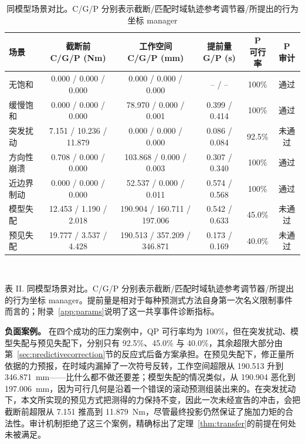 \documentclass[journal]{IEEEtran}
\begin{document}
\begin{table}[t]
\caption{同模型场景对比。C/G/P 分别表示截断/匹配时域轨迹参考调节器/所提出的行为坐标 manager}
\label{tab:scenarios}
\centering
\footnotesize
\setlength{\tabcolsep}{4pt}
\begin{tabular}{@{}lccccc@{}}
\toprule
场景 & \shortstack{截断前\\C/G/P (Nm)} & \shortstack{工作空间\\C/G/P (mm)} & \shortstack{提前量\\G/P (s)} & \shortstack{P\\可行率} & \shortstack{P\\审计} \\
\midrule
无饱和 & 0.000 / 0.000 / 0.000 & 0.000 / 0.000 / 0.000 & -- / -- & 100\% & 通过 \\
缓慢饱和 & 0.000 / 0.000 / 0.000 & 78.970 / 0.000 / 0.001 & 0.399 / 0.414 & 100\% & 通过 \\
突发扰动 & 7.151 / 10.236 / 11.879 & 0.000 / 0.000 / 0.000 & 0.086 / 0.084 & 92.5\% & 未通过 \\
方向性崩溃 & 0.708 / 0.000 / 0.000 & 103.868 / 0.000 / 0.003 & 0.307 / 0.340 & 100\% & 通过 \\
近边界制动 & 0.000 / 0.000 / 0.000 & 52.537 / 0.000 / 0.011 & 0.574 / 0.568 & 100\% & 通过 \\
模型失配 & 12.453 / 1.190 / 2.018 & 190.904 / 160.711 / 197.006 & 0.542 / 0.633 & 45.0\% & 未通过 \\
预见失配 & 19.777 / 3.537 / 4.428 & 190.513 / 357.209 / 346.871 & 0.173 / 0.169 & 40.0\% & 未通过 \\
\bottomrule
\end{tabular}
\\[2pt]
\raggedright\footnotesize 表 II. 同模型场景对比。C/G/P 分别表示截断/匹配时域轨迹参考调节器/所提出的行为坐标 manager。提前量是相对于每种预测式方法自身第一次名义限制事件而言的；附录~\ref{app:params}说明了这一共享事件诊断指标。
\end{table}

\textbf{负面案例。} 在四个成功的压力案例中，QP 可行率均为 100\%，但在突发扰动、模型失配与预见失配下，分别只有 92.5\%、45.0\% 与 40.0\%，其余超限大部分由第~\ref{sec:predictivecorrection}节的反应式后备方案承担。在预见失配下，修正量所依据的力预报，在时域内漏掉了一次符号反转，工作空间超限从 190.513 升到 346.871~mm——比什么都不做还要差；模型失配的情况类似，从 190.904 恶化到 197.006~mm，因为可行几何是沿着一个错误的滚动预测组装出来的。在突发扰动下，本文所实现的预见方式把测得的力保持不变，因此一次未经宣告的冲击，会把截断前超限从 7.151 推高到 11.879~Nm，尽管最终投影仍然保证了施加力矩的合法性。审计机制拒绝了这三个案例，精确标出了定理~\ref{thm:transfer}的前提在何处未被满足。
\end{document}
